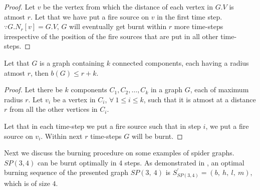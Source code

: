 \begin{proof}
    Let $v$ be the vertex from which the distance of each vertex in $G.V$ is atmost $r$. Let that we have put a fire source on $v$ in the first time step. $\because G.N_{r}[v]=G.V$, $G$ will eventually get burnt within $r$ more time-steps irrespective of the position of the fire sources that are put in all other time-steps.
\end{proof}

\begin{theorem}\label{theorem:burn-k-component-radius-r}
    Let that $G$ is a graph containing $k$ connected components, each having a radius atmost $r$, then $b(G)\leq r+k$.
\end{theorem}

\begin{proof}
    Let there be $k$ components $C_1,C_2,\dots,C_k$ in a graph $G$, each of maximum radius $r$. Let $v_i$ be a vertex in $C_i$, $\forall\ 1\leq i\leq k$, such that it is atmost at a distance $r$ from all the other vertices in $C_i$.
    
    Let that in each time-step we put a fire source such that in step $i$, we put a fire source on $v_i$. Within next $r$ time-steps $G$ will be burnt.
\end{proof}

Next we discuss the burning procedure on some examples of spider graphs. $SP(3,4)$ can be burnt optimally in 4 steps. As demonstrated in , an optimal burning sequence of the presented graph $SP(3,\ 4)$ is $S^\prime_{SP(3,4)}=(b,\ h,\ l,\ m)$, which is of size $4$.


